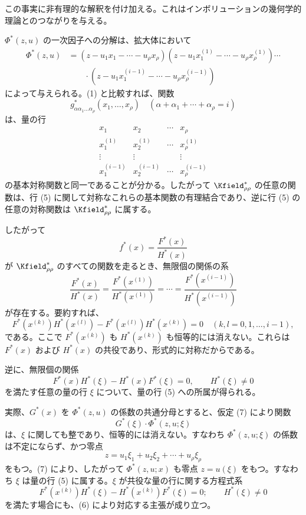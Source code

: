 \documentclass[11pt]{article}
\begin{document}
この事実に非有理的な解釈を付け加える。これはインボリューションの幾何学的理論とのつながりを与える。

$\Phi^*(z,u)$ の一次因子への分解は、拡大体において
\begin{equation}
\begin{aligned}
 \Phi^*(z,u)&=(z-u_1x_1-\cdots-u_\rho x_\rho)
 (z-u_1x_1^{(1)}-\cdots-u_\rho x_\rho^{(1)})\cdots\\
 &\qquad\cdot
 (z-u_1x_1^{(i-1)}-\cdots-u_\rho x_\rho^{(i-1)})
\end{aligned}
\tag{4}
\end{equation}
によって与えられる。(1) と比較すれば、関数
\[
  g^*_{\alpha\alpha_1\ldots\alpha_\rho}(x_1,
  \ldots,x_\rho)\quad(\alpha+\alpha_1+\cdots+\alpha_\rho=i)
\]
は、量の行
\begin{equation}
\begin{array}{cccc}
  x_1 & x_2 & \cdots & x_\rho\\
  x_1^{(1)} & x_2^{(1)} & \cdots & x_\rho^{(1)}\\
  \vdots & \vdots & & \vdots\\
  x_1^{(i-1)} & x_2^{(i-1)} & \cdots & x_\rho^{(i-1)}
\end{array}
\tag{5}
\end{equation}
の基本対称関数と同一であることが分かる。したがって $\Kfield^*_{\rho\rho}$ の任意の関数は、行 (5) に関して対称なこれらの基本関数の有理結合であり、逆に行 (5) の任意の対称関数は $\Kfield^*_{\rho\rho}$ に属する。

したがって
\[
  f^*(x)=\frac{F^*(x)}{H^*(x)}
\]
が $\Kfield^*_{\rho\rho}$ のすべての関数を走るとき、無限個の関係の系
\begin{equation}
  \frac{F^*(x)}{H^*(x)}=
  \frac{F^*(x^{(1)})}{H^*(x^{(1)})}=\cdots=
  \frac{F^*(x^{(i-1)})}{H^*(x^{(i-1)})}
\tag{6}
\end{equation}
が存在する。要約すれば、
\[
  F^*(x^{(k)})H^*(x^{(l)})-
  F^*(x^{(l)})H^*(x^{(k)})=0
  \quad(k,l=0,1,\ldots,i-1),
\]
である。ここで $F^*(x^{(k)})$ も $H^*(x^{(k)})$ も恒等的には消えない。これらは $F^*(x)$ および $H^*(x)$ の共役であり、形式的に対称だからである。

逆に、無限個の関係
\begin{equation}
  F^*(x)H^*(\xi)-H^*(x)F^*(\xi)=0,
  \qquad H^*(\xi)\ne0
\tag{7}
\end{equation}
を満たす任意の量の行 $\xi$ について、量の行 (5) への所属が得られる。

実際、$G^*(x)$ を $\Phi^*(z,u)$ の係数の共通分母とすると、仮定 (7) により関数
\[
  G^*(\xi)\cdot\Phi^*(z,u;\xi)
\]
は、$\xi$ に関しても整であり、恒等的には消えない。すなわち $\Phi^*(z,u;\xi)$ の係数は不定にならず、かつ零点
\[
  z=u_1\xi_1+u_2\xi_2+\cdots+u_\rho\xi_\rho
\]
をもつ。(7) により、したがって $\Phi^*(z,u;x)$ も零点 $z=u(\xi)$ をもつ。すなわち $\xi$ は量の行 (5) に属する。$\xi$ が共役な量の行に関する方程式系
\[
  F^*(x^{(k)})H^*(\xi)-H^*(x^{(k)})F^*(\xi)=0;
  \qquad H^*(\xi)\ne0
\]
を満たす場合にも、(6) により対応する主張が成り立つ。
\end{document}
